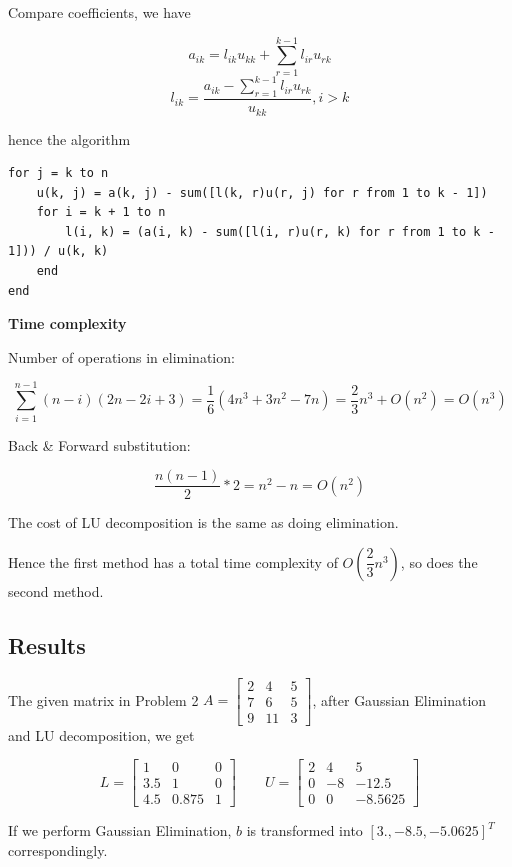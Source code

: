 \documentclass[11pt]{article}
\begin{document}
Compare coefficients, we have

\[
    a_{ik}=l_{ik}u_{kk} +\sum_{r=1}^{k-1}l_{ir}u_{rk}
\] \[
    l_{ik}=\dfrac{\displaystyle a_{ik} - \sum_{r=1}^{k-1}l_{ir}u_{rk}}{u_{kk}}, i>k
\]

hence the algorithm

\begin{verbatim}
for j = k to n 
    u(k, j) = a(k, j) - sum([l(k, r)u(r, j) for r from 1 to k - 1])
    for i = k + 1 to n 
        l(i, k) = (a(i, k) - sum([l(i, r)u(r, k) for r from 1 to k - 1])) / u(k, k)
    end
end
\end{verbatim}

\textbf{Time complexity}

Number of operations in elimination:

\[\sum_{i=1}^{n-1}(n-i)(2n-2i+3)=\dfrac{1}{6}(4n^3+3n^2-7n)=\dfrac{2}{3}n^3+O(n^2)=O(n^3)\]

Back \& Forward substitution:

\[\dfrac{n(n-1)}{2}*2=n^2-n=O(n^2)\]

The cost of LU decomposition is the same as doing elimination.

Hence the first method has a total time complexity of
\(O(\dfrac{2}{3}n^3)\), so does the second method.

    \hypertarget{results}{%
\subsection{Results}\label{results}}

The given matrix in Problem 2
\(A=\begin{bmatrix}2&4&5\\7&6&5\\9&11&3\end{bmatrix}\), after Gaussian
Elimination and LU decomposition, we get

\[
    L = \begin{bmatrix}1&0&0\\3.5&1&0\\4.5&0.875&1\end{bmatrix}\qquad U=\begin{bmatrix}2&4&5\\0&-8&-12.5\\0&0&-8.5625\end{bmatrix}
\]

If we perform Gaussian Elimination, \(b\) is transformed into
\([3. , -8.5 , -5.0625]^T\) correspondingly.
\end{document}
